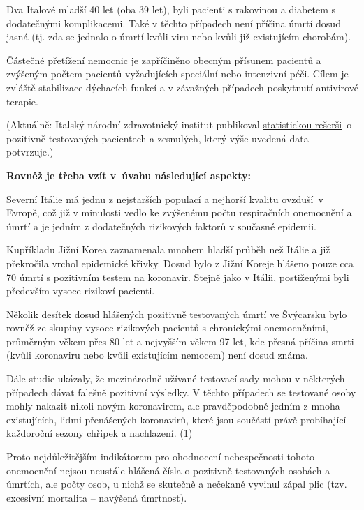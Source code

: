 Dva Italové mladší 40 let (oba 39 let), byli pacienti s rakovinou a
diabetem s dodatečnými komplikacemi. Také v těchto případech není
příčina úmrtí dosud jasná (tj. zda se jednalo o úmrtí kvůli viru nebo
kvůli již existujícím chorobám).

Částečné přetížení nemocnic je zapříčiněno obecným přísunem pacientů a
zvýšeným počtem pacientů vyžadujících speciální nebo intenzivní péči.
Cílem je zvláště stabilizace dýchacích funkcí a v závažných případech
poskytnutí antivirové terapie.

(Aktuálně: Italský národní zdravotnický institut publikoval
\href{https://www.epicentro.iss.it/coronavirus/bollettino/Report-COVID-2019_17_marzo-v2.pdf}{statistickou
rešerši}~o pozitivně testovaných pacientech a zesnulých, který výše
uvedená data potvrzuje.)

\textbf{Rovněž je třeba vzít v~úvahu následující aspekty:}

Severní Itálie má jednu z nejstarších populací a
\href{https://twitter.com/esa/status/1238480433047916545}{nejhorší
kvalitu ovzduší}~v Evropě, což již v minulosti vedlo ke zvýšenému počtu
respiračních onemocnění a úmrtí a je jedním z dodatečných rizikových
faktorů v současné epidemii.

Kupříkladu Jižní Korea zaznamenala mnohem hladší průběh než Itálie a již
překročila vrchol epidemické křivky. Dosud bylo z Jižní Koreje hlášeno
pouze cca 70 úmrtí s pozitivním testem na koronavir. Stejně jako v
Itálii, postiženými byli především vysoce rizikoví pacienti.

Několik desítek dosud hlášených pozitivně testovaných úmrtí ve Švýcarsku
bylo rovněž ze skupiny vysoce rizikových pacientů s chronickými
onemocněními, průměrným věkem přes 80 let a nejvyšším věkem 97 let, kde
přesná příčina smrti (kvůli koronaviru nebo kvůli existujícím nemocem)
není dosud známa.

Dále studie ukázaly, že mezinárodně užívané testovací sady mohou v
některých případech dávat falešně pozitivní výsledky. V těchto případech
se testované osoby mohly nakazit nikoli novým koronavirem, ale
pravděpodobně jedním z mnoha existujících, lidmi přenášených koronavirů,
které jsou součástí právě probíhající každoroční sezony chřipek a
nachlazení. (1)

Proto nejdůležitějším indikátorem pro ohodnocení nebezpečnosti tohoto
onemocnění nejsou neustále hlášená čísla o pozitivně testovaných osobách
a úmrtích, ale počty osob, u nichž se skutečně a nečekaně vyvinul zápal
plic (tzv. excesivní mortalita -- navýšená úmrtnost).

